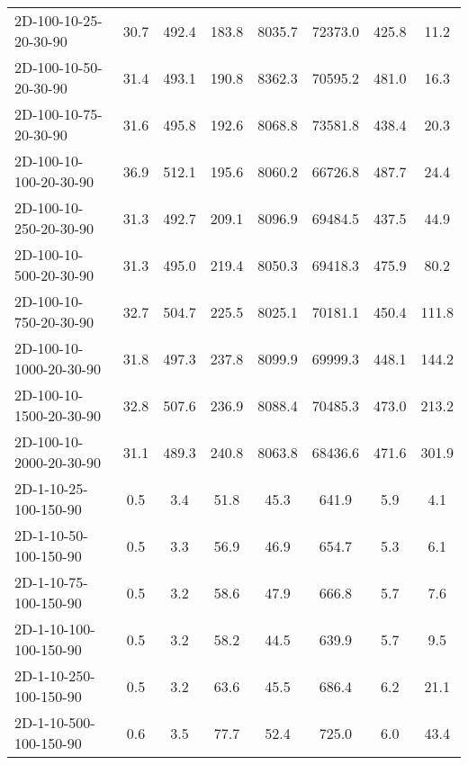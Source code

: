 \documentclass{article}
\begin{document}
\begin{center}
\begin{table}[h]
\begin{tabular}{|l||c|c|c|c|c|c|c|}
            \hline
            2D-100-10-25-20-30-90          & 30.7 & 492.4     & 183.8      & 8035.7      & 72373.0  & 425.8     & 11.2       \\
            2D-100-10-50-20-30-90          & 31.4 & 493.1     & 190.8      & 8362.3      & 70595.2  & 481.0     & 16.3       \\
            2D-100-10-75-20-30-90          & 31.6 & 495.8     & 192.6      & 8068.8      & 73581.8  & 438.4     & 20.3       \\
            2D-100-10-100-20-30-90         & 36.9 & 512.1     & 195.6      & 8060.2      & 66726.8  & 487.7     & 24.4       \\
            2D-100-10-250-20-30-90         & 31.3 & 492.7     & 209.1      & 8096.9      & 69484.5  & 437.5     & 44.9       \\
            2D-100-10-500-20-30-90         & 31.3 & 495.0     & 219.4      & 8050.3      & 69418.3  & 475.9     & 80.2       \\
            2D-100-10-750-20-30-90         & 32.7 & 504.7     & 225.5      & 8025.1      & 70181.1  & 450.4     & 111.8      \\
            2D-100-10-1000-20-30-90        & 31.8 & 497.3     & 237.8      & 8099.9      & 69999.3  & 448.1     & 144.2      \\
            2D-100-10-1500-20-30-90        & 32.8 & 507.6     & 236.9      & 8088.4      & 70485.3  & 473.0     & 213.2      \\
            2D-100-10-2000-20-30-90        & 31.1 & 489.3     & 240.8      & 8063.8      & 68436.6  & 471.6     & 301.9      \\
            \hline
            2D-1-10-25-100-150-90          & 0.5  & 3.4       & 51.8       & 45.3        & 641.9    & 5.9       & 4.1        \\
            2D-1-10-50-100-150-90          & 0.5  & 3.3       & 56.9       & 46.9        & 654.7    & 5.3       & 6.1        \\
            2D-1-10-75-100-150-90          & 0.5  & 3.2       & 58.6       & 47.9        & 666.8    & 5.7       & 7.6        \\
            2D-1-10-100-100-150-90         & 0.5  & 3.2       & 58.2       & 44.5        & 639.9    & 5.7       & 9.5        \\
            2D-1-10-250-100-150-90         & 0.5  & 3.2       & 63.6       & 45.5        & 686.4    & 6.2       & 21.1       \\
            2D-1-10-500-100-150-90         & 0.6  & 3.5       & 77.7       & 52.4        & 725.0    & 6.0       & 43.4       \\

\end{tabular}
\end{table}
\end{center}
\end{document}
